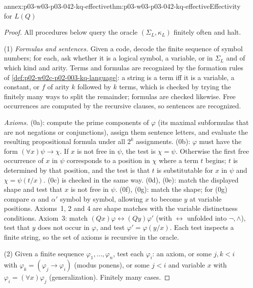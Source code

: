 \begin{annexitem}{annex:p03-w03-p03-042-kq-effective}{thm:p03-w03-p03-042-kq-effective}{Effectivity for \(L(Q)\)}
\begin{proof}
All procedures below query the oracle \((\Sigma_L,\kappa_L)\) finitely
often and halt.

(1) \emph{Formulas and sentences.}  Given a code, decode the finite
sequence of symbol numbers; for each, ask whether it is a logical symbol,
a variable, or in \(\Sigma_L\) and of which kind and arity.  Terms and
formulas are recognized by the formation rules of
\cref{def:p02-w02c-p02-003-kq-language}: a string is a term iff it is a
variable, a constant, or \(f\) of arity \(k\) followed by \(k\) terms,
which is checked by trying the finitely many ways to split the remainder;
formulas are checked likewise.  Free occurrences are computed by the
recursive clauses, so sentences are recognized.

\emph{Axioms.}  (0a): compute the prime components of \(\varphi\) (its
maximal subformulas that are not negations or conjunctions), assign them
sentence letters, and evaluate the resulting propositional formula under
all \(2^k\) assignments.  (0b): \(\varphi\) must have the form
\((\forall x)\psi\to\chi\).  If \(x\) is not free in \(\psi\), the test is
\(\chi=\psi\).  Otherwise the first free occurrence of \(x\) in \(\psi\)
corresponds to a position in \(\chi\) where a term \(t\) begins; \(t\) is
determined by that position, and the test is that \(t\) is substitutable
for \(x\) in \(\psi\) and \(\chi=\psi(t/x)\).  (0c) is checked in the same
way.  (0d), (0e): match the displayed shape and test that \(x\) is not free
in \(\psi\).  (0f), (0g): match the shape; for (0g) compare \(\alpha\) and
\(\alpha'\) symbol by symbol, allowing \(x\) to become \(y\) at variable
positions.  Axioms~1, 2 and 4 are shape matches with the variable
distinctness conditions.  Axiom~3: match
\((Qx)\varphi\leftrightarrow(Qy)\varphi'\) (with \(\leftrightarrow\)
unfolded into \(\neg,\land\)), test that \(y\) does not occur in
\(\varphi\), and test \(\varphi'=\varphi(y/x)\).  Each test inspects a
finite string, so the set of axioms is recursive in the oracle.

(2) Given a finite sequence \(\varphi_1,\ldots,\varphi_n\), test each
\(\varphi_i\): an axiom, or some \(j,k<i\) with \(\varphi_k=(\varphi_j\to
\varphi_i)\) (modus ponens), or some \(j<i\) and variable \(x\) with
\(\varphi_i=(\forall x)\varphi_j\) (generalization).  Finitely many cases.


\end{proof}
\end{annexitem}
